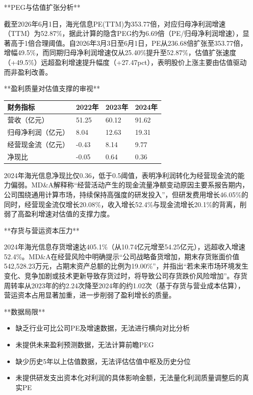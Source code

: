 \documentclass[12pt,a4paper]{article}
\begin{document}
**PEG与估值扩张分析**

截至2026年6月1日，海光信息PE(TTM)为353.77倍，对应归母净利润增速（TTM）为52.87\%，据此计算的隐含PEG约为6.69倍（PE/归母净利润增速），显著高于1倍合理阈值。自2026年3月3日至6月1日，PE从236.68倍扩张至353.77倍，增幅49.5\%，而同期归母净利润增速仅从25.40\%提升至52.87\%，估值扩张速度（+49.5\%）远超盈利增速提升幅度（+27.47pct），表明股价上涨主要由估值驱动而非盈利改善。

**盈利质量对估值支撑的审视**

\begin{table}[htbp]
\centering
\begin{tabular}{llll}
\toprule
财务指标 & 2022年 & 2023年 & 2024年 \\
\midrule
营收（亿元） & 51.25 & 60.12 & 91.62 \\
归母净利润（亿元） & 8.04 & 12.63 & 19.31 \\
经营现金流（亿元） & -0.43 & 8.14 & 9.77 \\
净现比 & -0.05 & 0.64 & 0.36 \\
\bottomrule
\end{tabular}
\end{table}


2024年海光信息净现比仅0.36，低于0.5阈值，表明净利润转化为经营现金流的能力偏弱。MD\&A解释称“经营活动产生的现金流量净额变动原因主要系报告期内，公司围绕通用计算市场，持续保持高强度的研发投入”，但研发费用增长46.05\%的同时，经营现金流仅增长20.08\%，收入增长52.4\%与现金流增长20.1\%的背离，削弱了高盈利增速对估值的支撑力度。

**存货与营运资本压力**

2024年海光信息存货增速达405.1\%（从10.74亿元增至54.25亿元），远超收入增速52.4\%。MD\&A在经营风险中明确提示“公司战略备货增加，期末存货账面价值542,528.23万元，占期末资产总额的比例为19.00\%”，并指出“若未来市场环境发生变化、竞争加剧或技术更新导致存货过时，将导致公司存货跌价风险增加”。存货周转率从2023年的约2.24次降至2024年的约1.02次（基于存货与营业成本估算），营运资本占用显著加重，进一步削弱了盈利增长的质量。

**数据局限**

\begin{itemize}
\item 缺乏行业可比公司PE及增速数据，无法进行横向对比分析
\item 未提供未来盈利预测数据，无法计算前瞻PEG
\item 缺少历史5年以上估值数据，无法评估估值中枢及历史分位
\item 未提供研发支出资本化对利润的具体影响金额，无法量化利润质量调整后的真实PE
\end{itemize}
\end{document}
